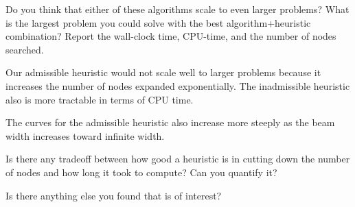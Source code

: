 \documentclass{article}
\newenvironment{Question}[2][Question]{\begin{trivlist}
\item[\hskip \labelsep {\bfseries #1}\hskip \labelsep {\bfseries #2.}]}{\end{trivlist}}
\begin{document}
\begin{Question}{7}Do you think that either of these algorithms scale to even larger problems? What is the largest problem you could solve with the best algorithm+heuristic combination? Report the wall-clock time, CPU-time, and the number of nodes searched.

Our admissible heuristic would not scale well to larger problems because it increases the number of nodes expanded exponentially. The inadmissible heuristic also is more tractable in terms of CPU time.

The curves for the admissible heuristic also increase more steeply as the beam width increases toward infinite width.



\end{Question}




\begin{Question}{8}Is there any tradeoff between how good a heuristic is in cutting down the number of nodes and how long it took to compute? Can you quantify it?




\end{Question}

\begin{Question}{9}Is there anything else you found that is of interest?


\end{Question}

\end{document}
